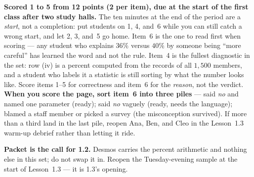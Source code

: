 \documentclass[10pt]{article}
\begin{document}
\begin{teachernote}[Homework]
\textbf{Scored 1 to 5 from 12 points (2 per item), due at the start of the first class after two study halls.} The ten minutes at the end of the
period are a \emph{start}, not a completion: put students on 1, 4, and~6 while you can still
catch a wrong start, and let 2, 3, and~5 go home. Item~6 is the one to read first when
scoring --- any student who explains $36\%$ versus $40\%$ by someone being ``more careful'' has
learned the word and not the rule. Item~4 is the fullest diagnostic in the set: row (iv) is a
percent computed from the records of all $1{,}500$ members, and a student who labels it a
statistic is still sorting by what the number looks like. Score items 1--5 for correctness and
item~6 for the \emph{reason}, not the verdict. \textbf{When you score the page, sort item~6
into three piles} --- said \emph{no} and named one parameter (ready); said \emph{no} vaguely
(ready, needs the language); blamed a staff member or picked a survey (the misconception
survived). If more than a third land in the last pile, reopen Ana, Ben, and Cleo in the
Lesson~1.3 warm-up debrief rather than letting it ride.

\textbf{Packet is the call for 1.2.} Desmos carries the percent arithmetic and nothing else in
this set; do not swap it in. Reopen the Tuesday-evening sample at the start of Lesson~1.3 --- it
is 1.3's opening.
\end{teachernote}
\end{document}
